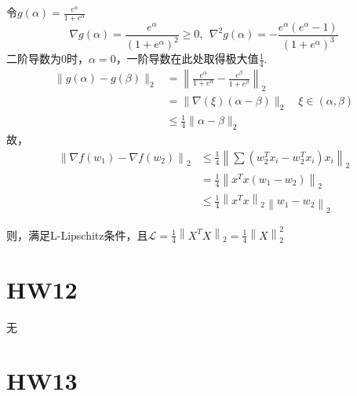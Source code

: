 \documentclass[UTF8,a4paper,AutoFakeBold,AutoFakeSlant]{article}
\begin{document}
令$ g(\alpha) = \frac{e^{\alpha}}{1+e^{\alpha}} $
$$ \nabla g(\alpha)=\frac{e^{\alpha}}{\left(1+e^{\alpha}\right)^{2}} \geq 0 ,~~  \nabla^{2} g(\alpha)=-\frac{e^{\alpha}\left(e^{\alpha}-1\right)}{\left(1+e^{\alpha}\right)^{3}} $$
二阶导数为0时，$\alpha=0$，一阶导数在此处取得极大值$\frac{1}{4}$.
\begin{equation*}
  \begin{aligned}
    \| g(\alpha)-g(\beta) \|_{2} & =\left\|\frac{e^{\alpha}}{1+e^{\alpha}}-\frac{e^{\beta}}{1+e^{\beta}}\right\|_{2} \\
                                 & =\|\nabla(\xi)(\alpha-\beta)\|_{2} \quad \xi \in(\alpha, \beta)                   \\
                                 & \leq \frac{1}{4}\|\alpha-\beta\|_{2}
  \end{aligned}
\end{equation*}
故，
\begin{equation*}
  \begin{aligned}
    \left\|\nabla f\left(w_1\right)-\nabla f(w_2)\right\|_{2} & \leq \frac{1}{4}\left\|\sum\left(w_2^{T} x_{i}-w_2^{T} x_{i}\right) x_{i}\right\|_{2} \\
                                                              & =\frac{1}{4}\left\|x^{T} x\left(w_1-w_2\right)\right\|_{2}                            \\
                                                              & \leq \frac{1}{4}\left\|x^{T} x\right\|_{2}\left\|w_1-w_2\right\|_{2}
  \end{aligned}
\end{equation*}

则，满足L-Lipschitz条件，且$ \mathcal{L} = \frac{1}{4} \left\|X^T X \right\|_2 = \frac{1}{4} \left\| X \right\|_2^2 $





\section{HW12}

无




\section{HW13}
\end{document}
